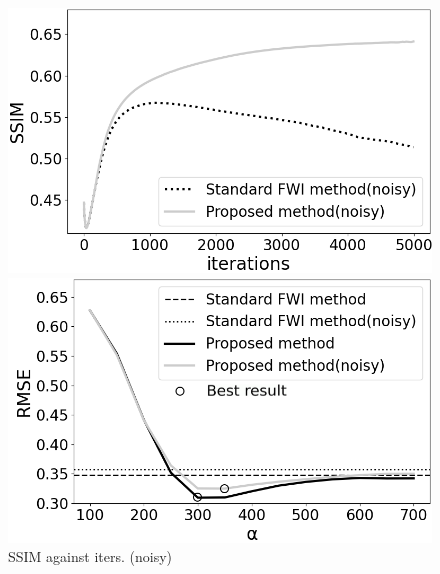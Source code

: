 \begin{figure}[htbp]
    \centering
    \hspace{-3mm}
    \begin{minipage}{58mm}
        \centering
        \includegraphics[width=\linewidth]{public/iters-ssim-noisy}
        \caption{SSIM against iters. (noisy)}
        \label{fig:iters-ssim-noisy}
        \vspace{-3mm}
    \end{minipage}
    \hspace{-1mm}
    \begin{minipage}{58mm}
        \centering
        \includegraphics[width=\linewidth]{public/alpha-rmse-edited}

\end{minipage}
\end{figure}
